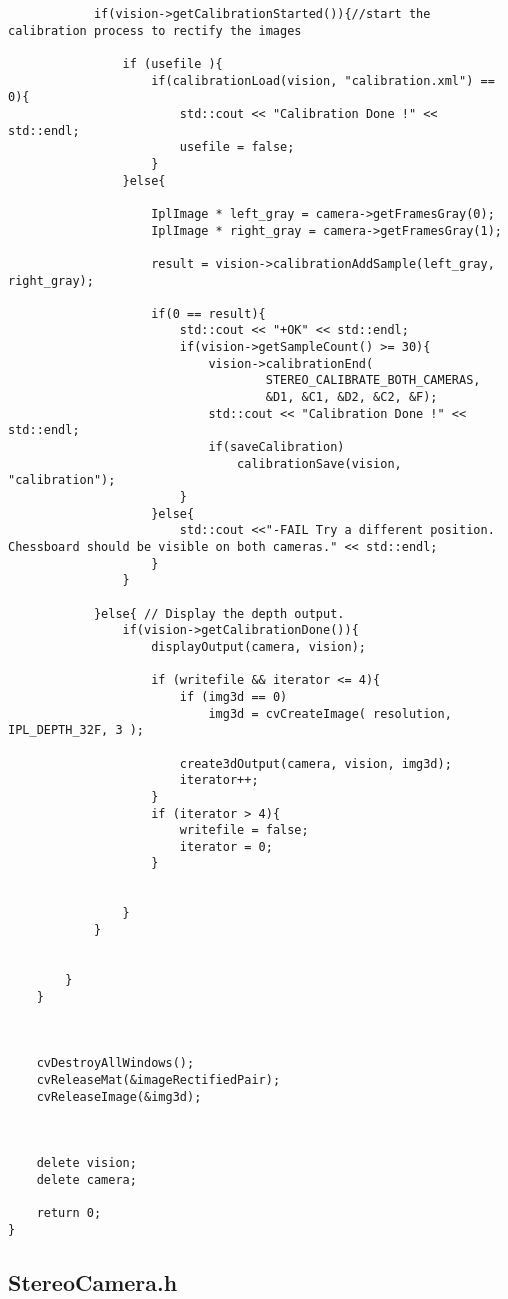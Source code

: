 \begin{lstlisting}
			if(vision->getCalibrationStarted()){//start the calibration process to rectify the images

				if (usefile ){
					if(calibrationLoad(vision, "calibration.xml") == 0){
						std::cout << "Calibration Done !" << std::endl;
						usefile = false;
					}
				}else{

					IplImage * left_gray = camera->getFramesGray(0);
					IplImage * right_gray = camera->getFramesGray(1);

					result = vision->calibrationAddSample(left_gray, right_gray);

					if(0 == result){
						std::cout << "+OK" << std::endl;
						if(vision->getSampleCount() >= 30){
							vision->calibrationEnd(
									STEREO_CALIBRATE_BOTH_CAMERAS,
									&D1, &C1, &D2, &C2, &F);
							std::cout << "Calibration Done !" << std::endl;
							if(saveCalibration)
								calibrationSave(vision, "calibration");
						}
					}else{
						std::cout <<"-FAIL Try a different position. Chessboard should be visible on both cameras." << std::endl;
					}
				}

			}else{ // Display the depth output.
				if(vision->getCalibrationDone()){
					displayOutput(camera, vision);

					if (writefile && iterator <= 4){
						if (img3d == 0)
							img3d = cvCreateImage( resolution, IPL_DEPTH_32F, 3 );

						create3dOutput(camera, vision, img3d);
						iterator++;
					}
					if (iterator > 4){
						writefile = false;
						iterator = 0;
					}


				}
			}


		}
	}



	cvDestroyAllWindows();
	cvReleaseMat(&imageRectifiedPair);
	cvReleaseImage(&img3d);



    delete vision;
    delete camera;

    return 0;
}
\end{lstlisting}

\subsection{StereoCamera.h}

